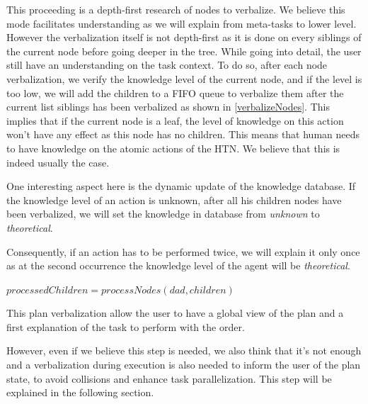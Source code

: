 \documentclass{llncs}
\begin{document}
This proceeding is a depth-first research of nodes to verbalize. We believe this mode facilitates understanding as we will explain from meta-tasks to lower level. However the verbalization itself is not depth-first as it is done on every siblings of the current node before going deeper in the tree. While going into detail, the user still have an understanding on the task context.
To do so, after each node verbalization, we verify the knowledge level of the current node, and if the level is too low, we will add the children
to a FIFO queue to verbalize them after the current list siblings has been verbalized as shown in \ref{verbalizeNodes}. 
This implies that if the current node is a leaf, the level of knowledge on this action won't have any effect as this node has no children. This means that human needs to have knowledge on the atomic actions of the HTN.
We believe that this is indeed usually the case.

One interesting aspect here is the dynamic update of the knowledge database.
If the knowledge level of an action is unknown, after all his children nodes have been verbalized, we will set the knowledge in database from \textit{unknown} to \textit{theoretical}.

Consequently, if an action has to be performed twice, we will explain it only once as at the second occurrence the knowledge level of the agent will be \textit{theoretical}.

\begin{algorithm}[H]
$processedChildren = processNodes(dad, children)$\;

    \caption{$verbalize\_nodes$ \label{verbalizeNodes}}

\end{algorithm}

This plan verbalization allow the user to have a global view of the plan and a first explanation of the task to perform with the order.

However, even if we believe this step is needed, we also think that it's not enough and a verbalization during execution is also needed to inform the user of the plan state, to avoid collisions and enhance task parallelization. This step will be explained in the following section.
\end{document}
